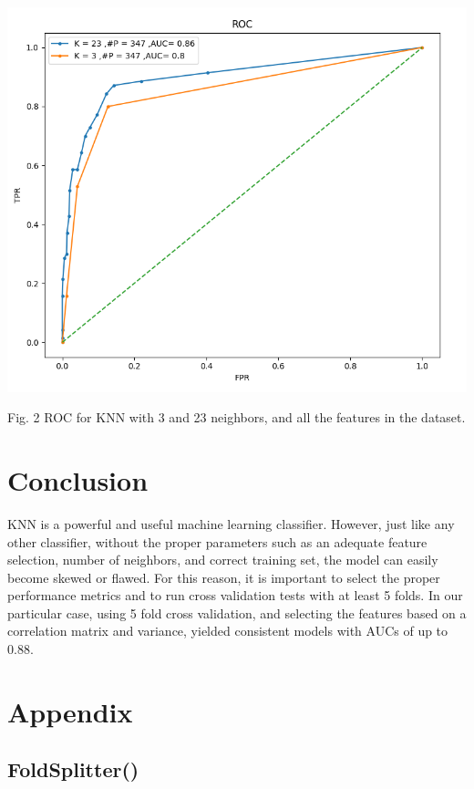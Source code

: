 \documentclass{article}
\begin{document}
\begin{center}
\includegraphics[scale=.25]{ROC_allfeatures.png}
\end{center}
Fig. 2 ROC for KNN with 3 and 23 neighbors, and all the features in the dataset.


\section{Conclusion}
KNN is a powerful and useful machine learning classifier. However, just like any other classifier, without the proper parameters such as an adequate feature selection, number of neighbors, and correct training set, the model can easily become skewed or flawed. For this reason, it is important to select the proper performance metrics and to run cross validation tests with at least 5 folds. In our particular case, using 5 fold cross validation, and selecting the features based on a correlation matrix and variance, yielded consistent models with AUCs of up to 0.88.   \\ 

\section{Appendix}
\subsection{FoldSplitter()}
\end{document}
